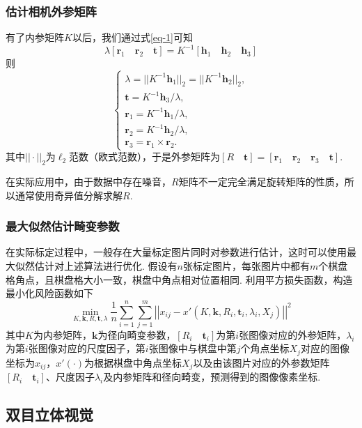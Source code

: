 \documentclass[12pt, a4paper, oneside]{ctexart}
\numberwithin{equation}{section}  %
\theoremstyle{definition}
\def\bd{\boldsymbol}        %
\begin{document}
\subsubsection{估计相机外参矩阵}
有了内参矩阵$K$以后，我们通过式\ref{eq-1}可知
\begin{equation*}
    \lambda[\bd{r}_1\quad \bd{r}_2\quad \bd{t}] = K^{-1}[\bd{h}_1\quad \bd{h}_2\quad \bd{h}_3]
\end{equation*}
则
\begin{equation*}
    \begin{cases}
        \lambda = ||K^{-1}\bd{h}_1||_2 = ||K^{-1}\bd{h}_2||_2,\\
        \bd{t} = K^{-1}\bd{h}_3/\lambda,\\
        \bd{r}_1 = K^{-1}\bd{h}_1/\lambda,\\
        \bd{r}_2 = K^{-1}\bd{h}_2/\lambda,\\
        \bd{r}_3=\bd{r}_1\times \bd{r}_2.
    \end{cases}
\end{equation*}
其中$||\cdot||_2$为$\ell_2$范数（欧式范数），于是外参矩阵为$[R\quad \bd{t}] = [\bd{r}_1\quad \bd{r}_2\quad \bd{r}_3\quad \bd{t}]$.

在实际应用中，由于数据中存在噪音，$R$矩阵不一定完全满足旋转矩阵的性质，所以通常使用奇异值分解求解$R$.

\subsubsection{最大似然估计畸变参数}
在实际标定过程中，一般存在大量标定图片同时对参数进行估计，这时可以使用最大似然估计对上述算法进行优化. 假设有$n$张标定图片，每张图片中都有$m$个棋盘格角点，且棋盘格大小一致，棋盘中角点相对位置相同. 利用平方损失函数，构造最小化风险函数如下
\begin{equation*}
    \min_{K,\bd{k},R,\bd{t},\lambda}\frac{1}{n}\sum_{i=1}^n\sum_{j=1}^m\left|\left|x_{ij}-x'(K,\bd{k},R_i,\bd{t}_i,\lambda_i,X_{j})\right|\right|^2
\end{equation*}
其中$K$为内参矩阵，$\bd{k}$为径向畸变参数，$[R_i\quad \bd{t}_i]$为第$i$张图像对应的外参矩阵，$\lambda_i$为第$i$张图像对应的尺度因子，第$i$张图像中与棋盘中第$j$个角点坐标$X_{j}$对应的图像坐标为$x_{ij}$，$x'(\cdot)$为根据棋盘中角点坐标$X_{j}$以及由该图片对应的外参数矩阵$[R_i\quad \bd{t}_i]$、尺度因子$\lambda_i$及内参矩阵和径向畸变，预测得到的图像像素坐标.

\subsection{双目立体视觉}
\end{document}
